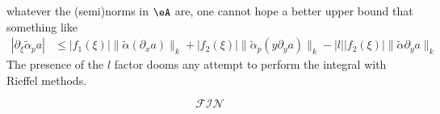 whatever the (semi)norms in $\eA$ are, one cannot hope a better upper bound that something like
\[ 
 \begin{split} 
  | \partial_{\xi}\tilde\alpha_pa |&\leq | f_1(\xi) |\| \tilde\alpha(\partial_xa) \|_k+| f_2(\xi) |\| \tilde\alpha_p(y\partial_ya) \|_k-| l | |f_2(\xi) |\| \tilde\alpha\partial_ya \|_k
\end{split}
\]
The presence of the $l$ factor dooms any attempt to perform the integral with Rieffel methods.

\[
  \mathcal{FIN}
\]
